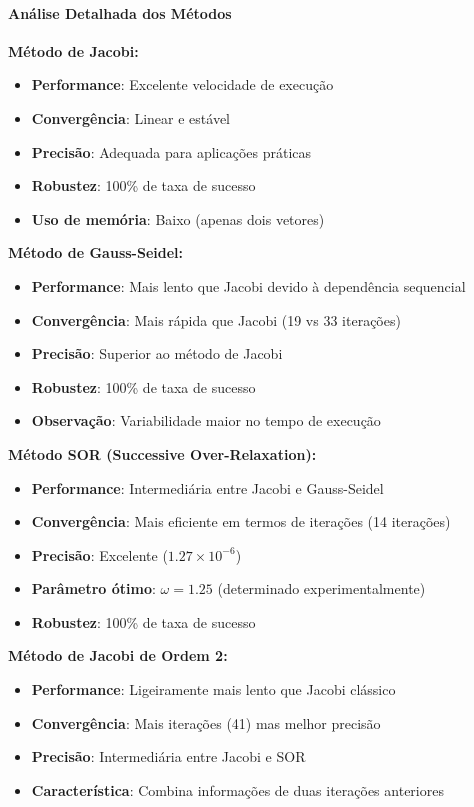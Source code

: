 \documentclass[12pt,a4paper]{article}
\begin{document}
\paragraph{Análise Detalhada dos Métodos}
\textbf{Método de Jacobi:}
\begin{itemize}
    \item \textbf{Performance}: Excelente velocidade de execução
    \item \textbf{Convergência}: Linear e estável
    \item \textbf{Precisão}: Adequada para aplicações práticas
    \item \textbf{Robustez}: 100\% de taxa de sucesso
    \item \textbf{Uso de memória}: Baixo (apenas dois vetores)
\end{itemize}

\textbf{Método de Gauss-Seidel:}
\begin{itemize}
    \item \textbf{Performance}: Mais lento que Jacobi devido à dependência sequencial
    \item \textbf{Convergência}: Mais rápida que Jacobi (19 vs 33 iterações)
    \item \textbf{Precisão}: Superior ao método de Jacobi
    \item \textbf{Robustez}: 100\% de taxa de sucesso
    \item \textbf{Observação}: Variabilidade maior no tempo de execução
\end{itemize}

\textbf{Método SOR (Successive Over-Relaxation):}
\begin{itemize}
    \item \textbf{Performance}: Intermediária entre Jacobi e Gauss-Seidel
    \item \textbf{Convergência}: Mais eficiente em termos de iterações (14 iterações)
    \item \textbf{Precisão}: Excelente ($1.27\times 10^{-6}$)
    \item \textbf{Parâmetro ótimo}: $\omega = 1.25$ (determinado experimentalmente)
    \item \textbf{Robustez}: 100\% de taxa de sucesso
\end{itemize}

\textbf{Método de Jacobi de Ordem 2:}
\begin{itemize}
    \item \textbf{Performance}: Ligeiramente mais lento que Jacobi clássico
    \item \textbf{Convergência}: Mais iterações (41) mas melhor precisão
    \item \textbf{Precisão}: Intermediária entre Jacobi e SOR
    \item \textbf{Característica}: Combina informações de duas iterações anteriores
\end{itemize}
\end{document}
